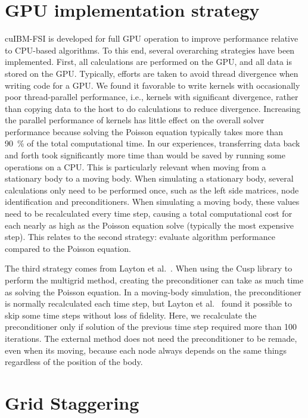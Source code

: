 \documentclass[onehalf,11pt]{beavtex}
\begin{document}
\section{GPU implementation strategy}
\label{GPU implementation strategy}
cuIBM-FSI is developed for full GPU operation to improve performance relative to CPU-based algorithms. 
To this end, several overarching strategies have been implemented. 
First, all calculations are performed on the GPU, and all data is stored on the GPU.
Typically, efforts are taken to avoid thread divergence when writing code for a GPU. 
We found it favorable to write kernels with occasionally poor thread-parallel performance, i.e., kernels with significant divergence, rather than copying data to the host to do calculations to reduce divergence. 
Increasing the parallel performance of kernels has little effect on the overall solver performance because solving the Poisson equation typically takes more than \SI{90}{\percent} of the total computational time. 
In our experiences, transferring data back and forth took significantly more time than would be saved by running some operations on a CPU. 
This is particularly relevant when moving from a stationary body to a moving body.
When simulating a stationary body, several calculations only need to be performed once, such as the left side matrices, node identification and preconditioners.
When simulating a moving body, these values need to be recalculated every time step, causing a total computational cost for each nearly as high as the Poisson equation solve (typically the most expensive step). 
This relates to the second strategy: evaluate algorithm performance compared to the Poisson equation. 

The third strategy comes from Layton et al.~\cite{layton2011cuibm}.
When using the Cusp library to perform the multigrid method, creating the preconditioner can take as much time as solving the Poisson equation.
In a moving-body simulation, the preconditioner is normally recalculated each time step, but Layton et al.~\cite{layton2011cuibm} found it possible to skip some time steps without loss of fidelity.
Here, we recalculate the preconditioner only if solution of the previous time step required more than 100 iterations. 
The external method does not need the preconditioner to be remade, even when its moving, because each node always depends on the same things regardless of the position of the body. 


\section{Grid Staggering}
\label{Grid Staggering}
\end{document}
